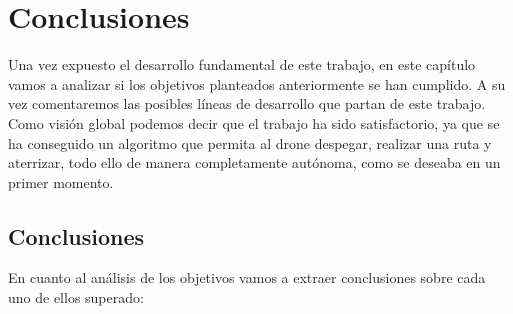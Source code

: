 \chapter{Conclusiones}\label{cap.conclusiones}
\hspace{1cm} Una vez expuesto el desarrollo fundamental de este trabajo, en este capítulo vamos a analizar si los objetivos planteados anteriormente se han cumplido. A su vez comentaremos las posibles líneas de desarrollo que partan de este trabajo. Como visión global podemos decir que el trabajo ha sido satisfactorio, ya que se ha conseguido un algoritmo que permita al drone despegar, realizar una ruta y aterrizar, todo ello de manera completamente autónoma, como se deseaba en un primer momento. 

\section{Conclusiones}
\hspace{1cm} En cuanto al análisis de los objetivos vamos a extraer conclusiones sobre cada uno de ellos superado:

